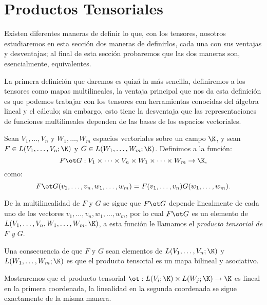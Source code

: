 \section{Productos Tensoriales}
\label{Sección: Productos Tensoriales}
Existen diferentes maneras de definir lo que, con los tensores, nosotros
estudiaremos en esta sección dos maneras de definirlos, cada una con sus
ventajas y desventajas; al final de esta sección probaremos que las dos
maneras son, esencialmente, equivalentes.

La primera definición que daremos es quizá la más sencilla, definiremos a los
tensores como mapas multilineales, la ventaja principal que nos da esta
definición es que podemos trabajar con los tensores con herramientas conocidas
del álgebra lineal y el cálculo; sin embargo, esto tiene la desventaja que las
representaciones de funciones multilineales dependen de las bases de los
espacios vectoriales.

\begin{definition}
	Sean $V_1, \ldots, V_n$ y $W_1, \ldots, W_m$ espacios vectoriales sobre un
	campo $\K$, y sean $F \in L(V_1,\ldots,V_n;\K)$ y $G \in
		L(W_1, \ldots, W_m; \K)$. Definimos a la función:
	\[
		F \ot G:
		V_1 \times \cdots \times V_n \times W_1 \times \cdots \times W_m
		\to \K,
	\]
	como:
	\[
		F \ot G (v_1,\ldots,v_n,w_1,\ldots,w_m)
		= F(v_1,\ldots,v_n)G(w_1,\ldots,w_m).
	\]
\end{definition}
De la multilinealidad de $F$ y $G$ se sigue que $F \ot G$ depende
linealmente de cada uno de los vectores $v_1, \ldots, v_n, w_1, \ldots, w_m$,
por lo cual $F \ot G$ es un elemento de $L(V_1,\ldots,V_n,W_1,\ldots,W_m;
	\K)$, a esta función le llamamos el \textit{producto tensorial de $F$
	y $G$}.

Una consecuencia de que $F$ y $G$ sean elementos de $L(V_1,\ldots,V_n;
	\K)$ y $L(W_1,\ldots, W_m;\K)$ es que el producto tensorial es
un mapa bilineal y asociativo.

Mostraremos que el producto tensorial $\ot: L(V_i;\K) \times
	L(W_j; \K) \to \K$ es lineal en la primera coordenada, la
linealidad en la segunda coordenada se sigue exactamente de la misma manera.

